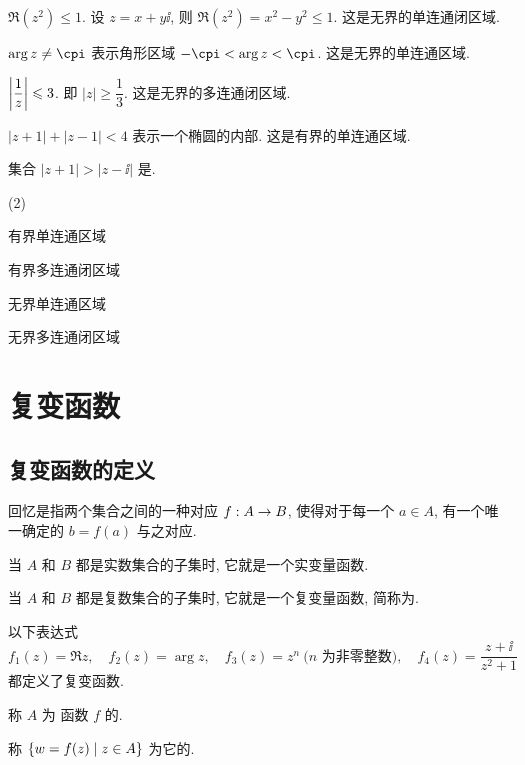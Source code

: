 \begin{exampleenum}
  \item $\Re(z^2)\le1$. 设 $z=x+y\ii$, 则 $\Re(z^2)=x^2-y^2\le1$. 这是无界的单连通闭区域.
  \item $\arg z\neq \cpi$ 表示角形区域 $-\cpi<\arg z<\cpi$. 这是无界的单连通区域.
  \item $\left|\dfrac1z\right|\leqslant3$. 即 $|z|\ge\dfrac13$. 这是无界的多连通闭区域.
  \item $|z+1|+|z-1|<4$ 表示一个椭圆的内部. 这是有界的单连通区域.
\end{exampleenum}

\begin{exercise}
  集合 $|z+1|>|z-\ii|$ 是\fillbrace{}.
  \begin{examplechoice}(2)
    \item 有界单连通区域
    \item 有界多连通闭区域
    \item 无界单连通区域
    \item 无界多连通闭区域
  \end{examplechoice}
\end{exercise}



\section{复变函数}

\subsection{复变函数的定义}

回忆是指两个集合之间的一种对应 $f:A\rightarrow B$, 使得对于每一个 $a\in A$, 有一个唯一确定的 $b=f(a)$ 与之对应.
\begin{enuma}
  \item 当 $A$ 和 $B$ 都是实数集合的子集时, 它就是一个实变量函数.
  \item 当 $A$ 和 $B$ 都是复数集合的子集时, 它就是一个复变量函数, 简称为.
\end{enuma}

\begin{example}
  以下表达式
  \[
    f_1(z)=\Re z,\quad
    f_2(z)=\arg z,\quad
    f_3(z)=z^n \ \text{($n$ 为非零整数)},\quad
    f_4(z)=\frac{z+\ii}{z^2+1}
  \]
  都定义了复变函数.
\end{example}

\begin{definition}
  \begin{enuma}
    \item 称 $A$ 为 函数 $f$ 的.
    \item 称 ${\left\{w=f(z)\mid z\in A\right\}}$ 为它的.\footnotemark
  \end{enuma} 
\end{definition}


